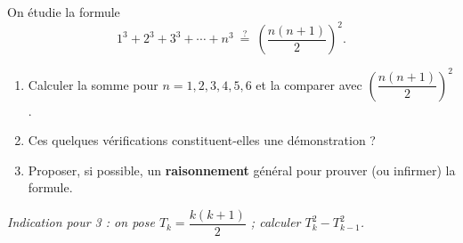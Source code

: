 On étudie la formule
\[
1^3 + 2^3 + 3^3 + \cdots + n^3 \ \stackrel{?}{=}\ \left( \frac{n(n+1)}{2} \right)^{2}.
\]
\begin{enumerate}
  \item Calculer la somme pour $n = 1, 2, 3, 4, 5, 6$ et la comparer avec
  $\left( \dfrac{n(n+1)}{2} \right)^{2}$.
  \item Ces quelques vérifications constituent-elles une démonstration ?
  \item Proposer, si possible, un \textbf{raisonnement} général pour prouver
  (ou infirmer) la formule.
\end{enumerate}
\emph{Indication pour 3 : on pose $T_k = \dfrac{k(k+1)}{2}$ ; calculer
$T_k^2 - T_{k-1}^2$.}
